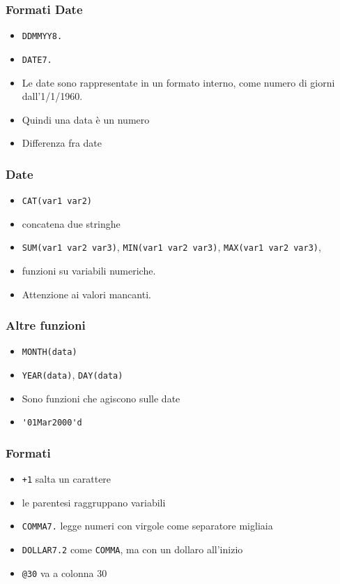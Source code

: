 \begin{frame}[fragile]\frametitle{Formati Date}
  \begin{itemize}
  \item
    \verb!DDMMYY8.!
  \item
    \verb!DATE7.!
  \item
    Le date sono rappresentate in un formato interno, come numero di giorni dall'1/1/1960.
  \item
    Quindi una data {\`e} un numero
  \item
    Differenza fra date
  \end{itemize}
\end{frame}

\begin{frame}[fragile]\frametitle{Date}
  \begin{itemize}
  \item
    \verb!CAT(var1 var2)!
  \item
    concatena due stringhe
  \item
    \verb!SUM(var1 var2 var3)!,  \verb!MIN(var1 var2 var3)!,
    \verb!MAX(var1 var2 var3)!,
  \item
    funzioni su variabili numeriche.
  \item
    Attenzione ai valori mancanti.
  \end{itemize}
\end{frame}

\begin{frame}[fragile]\frametitle{Altre funzioni}
  \begin{itemize}
  \item
    \verb!MONTH(data)!
  \item
    \verb!YEAR(data)!,  \verb!DAY(data)!
  \item
    Sono funzioni che agiscono sulle date
  \item
    \verb!'01Mar2000'd!
  \end{itemize}
\end{frame}



\begin{frame}[containsverbatim]\frametitle{Formati}

  \begin{itemize}
  \item
    \verb!+1! salta un carattere
  \item
    le parentesi raggruppano variabili
  \item
    \verb!COMMA7.! legge numeri con virgole come separatore migliaia
  \item
    \verb!DOLLAR7.2! come \verb!COMMA!, ma con un dollaro all'inizio
  \item
    \verb!@30! va a colonna 30
  \end{itemize}
\end{frame}


